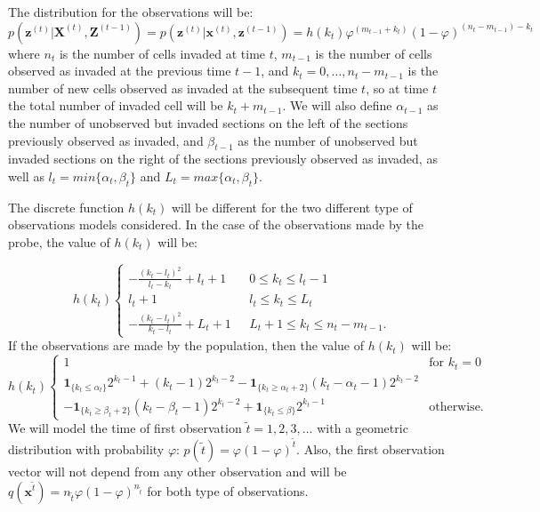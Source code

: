 \documentclass[11pt,a4paper]{article}
\newcommand{\one}[1]{\mathbf{1}_{\{#1\}}}
\renewcommand{\vec}[1]{\mathbf{#1}}
\begin{document}
The distribution for the observations will be:
\[
    p(\vec{z}^{(t)} | \vec{X}^{(t)}, \vec{Z}^{(t-1)}) = p(\vec{z}^{(t)} | \vec{x}^{(t)}, \vec{z}^{(t-1)}) = h(k_t) \varphi^{(m_{t-1}+k_t)} (1-\varphi)^{(n_t-m_{t-1})-k_t}
\]
where $n_t$ is the number of cells invaded at time $t$, $m_{t-1}$ is the number of cells observed as invaded at the previous time $t-1$, and $k_t = 0, \dots, n_t-m_{t-1}$ is the number of new cells observed as invaded at the subsequent time $t$, so at time $t$ the total number of invaded cell will be $k_t + m_{t-1}$. We will also define $\alpha_{t-1}$ as the number of unobserved but invaded sections on the left of the sections previously observed as invaded, and $\beta_{t-1}$ as the number of unobserved but invaded sections on the right of the sections previously observed as invaded, as well as $l_t=min\{\alpha_t, \beta_t \}$ and $L_t=max\{\alpha_t, \beta_t\}$.

The discrete function $h(k_t)$ will be different for the two different type of observations models considered. In the case of the observations made by the probe, the value of $h(k_t)$ will be:

\[
    h(k_t)
    \begin{cases}
          -\frac{(k_t - l_t)^2}{l_t - k_t} + l_t + 1 & \mbox{   } 0 \leq k_t \leq l_t -1\\
          l_t + 1 & \mbox{   } l_t \leq k_t \leq L_t \\
          -\frac{(k_t - l_t)^2}{k_t - l_t} + L_t + 1 & \mbox{   } L_t + 1 \leq k_t \leq n_t-m_{t-1}.
    \end{cases}
\]
If the observations are made by the population, then the value of $h(k_t)$ will be:
\[
    h(k_t)
    \begin{cases}
          1 & \mbox{for   } k_t = 0\\
          \one{k_t \leq \alpha_t} 2^{k_t-1} + (k_t-1)2^{k_t-2} - \one{k_t \geq \alpha_t+2} (k_t-\alpha_t-1)2^{k_t-2}\\ - \one{k_t \geq \beta_t+2}(k_t-\beta_t-1)2^{k_t-2} + \one{k_t \leq \beta}2^{k_t-1} & \mbox{otherwise}.
    \end{cases}
\]
We will model the time of first observation $\tilde{t} = 1, 2, 3, \dots$ with a geometric distribution with probability $\varphi$: $p(\tilde{t}) = \varphi (1-\varphi)^{\tilde{t}}$. Also, the first observation vector will not depend from any other observation and will be $q(\vec{x}^{\tilde{t}}) = n_{\tilde{t}}\varphi (1 - \varphi)^{n_{\tilde{t}}}$ for both type of observations.
\end{document}
